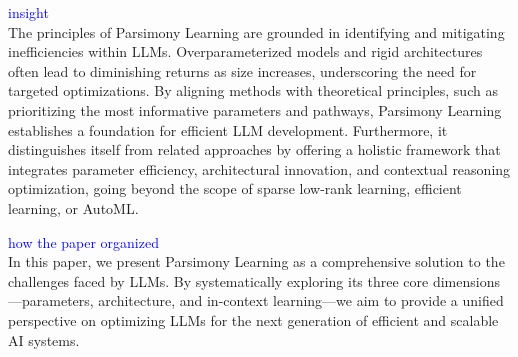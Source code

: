 \textcolor{blue}{insight}\\
The principles of Parsimony Learning are grounded in identifying and mitigating inefficiencies within LLMs. Overparameterized models and rigid architectures often lead to diminishing returns as size increases, underscoring the need for targeted optimizations. By aligning methods with theoretical principles, such as prioritizing the most informative parameters and pathways, Parsimony Learning establishes a foundation for efficient LLM development. Furthermore, it distinguishes itself from related approaches by offering a holistic framework that integrates parameter efficiency, architectural innovation, and contextual reasoning optimization, going beyond the scope of sparse low-rank learning, efficient learning, or AutoML.

\textcolor{blue}{how the paper organized}\\
In this paper, we present Parsimony Learning as a comprehensive solution to the challenges faced by LLMs. By systematically exploring its three core dimensions—parameters, architecture, and in-context learning—we aim to provide a unified perspective on optimizing LLMs for the next generation of efficient and scalable AI systems.


